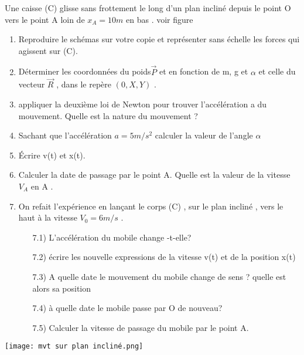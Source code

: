 \documentclass[10pt,a4paper]{article}
\begin{document}
\begin{tcolorbox}[sabour,title=EXERCICE 14]


 Une caisse (C) glisse sans frottement le long d'un plan incliné depuis le point O vers le point A loin de $x_A=10m$ en bas . voir figure 
 \begin{enumerate}
 \item  Reproduire le schémas sur votre copie et représenter sans échelle les forces qui agissent sur (C).
 \item Déterminer  les coordonnées du poids$ \vec{P}$ et en fonction de m, g et $\alpha$ et celle du vecteur $ \vec{R}$ , dans le repère $(0,X,Y) $ .
 \item appliquer la deuxième loi de Newton pour trouver l'accélération a du mouvement. Quelle est la nature du mouvement ? 
 \item  Sachant que l'accélération $a=5m/s^2$ calculer la valeur de l'angle $\alpha$
 \item Écrire v(t) et x(t). 
 \item Calculer la date de passage par le point A. Quelle est la valeur de la vitesse $V_A$  en A .
 \item On refait l'expérience en lançant le corps (C)  , sur le plan incliné , vers le haut à la vitesse $V_0=6m/s$ . 
\begin{enumerate}
\item[7.1)] L'accélération du mobile change -t-elle?
\item[7.2)] écrire les nouvelle expressions de la vitesse v(t) et de la position x(t) 
\item[7.3)]  A quelle date le mouvement du mobile change de sens ? quelle est alors sa position 
\item[7.4)] à quelle date le mobile passe par O de nouveau?
\item[7.5)] Calculer la vitesse de passage du mobile par le point A.
\end{enumerate}
 \end{enumerate}
\begin{center}
\texttt{[image: mvt sur plan incliné.png]} 
\end{center}

\end{tcolorbox}
\end{document}
